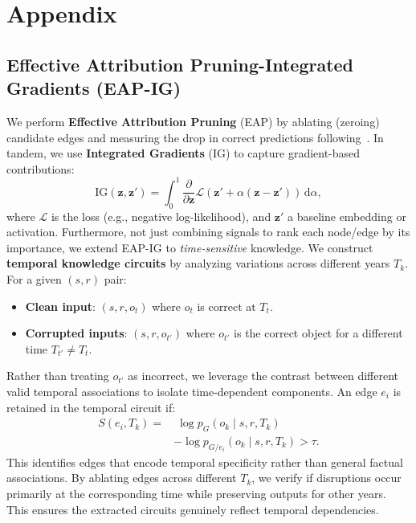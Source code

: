 \section{Appendix}
\subsection{Effective Attribution Pruning-Integrated Gradients (EAP-IG)}
\label{sec:EAP-IG}
We perform \textbf{Effective Attribution Pruning} (EAP) by ablating (zeroing) candidate edges and measuring the drop in correct predictions following~\citealp{eapig}. 
In tandem, we use \textbf{Integrated Gradients} (IG) to capture gradient-based contributions:
\begin{equation}
\mathrm{IG}(\mathbf{z},\mathbf{z}') = \int_{0}^{1} 
\frac{\partial}{\partial \mathbf{z}} \mathcal{L}(\mathbf{z}' + \alpha(\mathbf{z}-\mathbf{z}'))
\,\mathrm{d}\alpha,
\end{equation}
where $\mathcal{L}$ is the loss (e.g., negative log-likelihood), and $\mathbf{z}'$ a baseline embedding or activation. 
Furthermore, not just combining signals to rank each node/edge by its importance, we extend EAP-IG to \emph{time-sensitive} knowledge.
We construct \textbf{temporal knowledge circuits} by analyzing variations across different years $T_k$. 
For a given $(s,r)$ pair:
\begin{itemize}
    \item \textbf{Clean input}: $(s,r,o_t)$ where $o_t$ is correct at $T_t$.
    \item \textbf{Corrupted inputs}: $(s,r,o_{t'})$ where $o_{t'}$ is the correct object for a different time $T_{t'} \neq T_t$.
\end{itemize}
Rather than treating $o_{t'}$ as incorrect, we leverage the contrast between different valid temporal associations to isolate time-dependent components. An edge $e_i$ is retained in the temporal circuit if:
\begin{equation}
\begin{split}
S(e_i, T_k) = &\; \log p_G(o_k \mid s,r,T_k) \\
& - \log p_{G/e_i}(o_k \mid s,r,T_k) > \tau.
\end{split}
\end{equation}
This identifies edges that encode temporal specificity rather than general factual associations.
By ablating edges across different $T_k$, we verify if disruptions occur primarily at the corresponding time while preserving outputs for other years. This ensures the extracted circuits genuinely reflect temporal dependencies.

